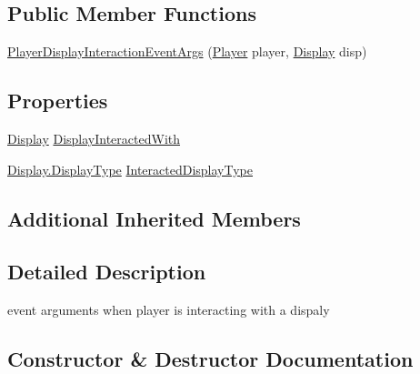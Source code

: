 \subsection*{Public Member Functions}
\begin{DoxyCompactItemize}
\item 
\mbox{\hyperlink{class_player_display_interaction_event_args_a55466b3a7dae1ed3b825c4e6c7e4967c}{Player\+Display\+Interaction\+Event\+Args}} (\mbox{\hyperlink{class_player}{Player}} player, \mbox{\hyperlink{class_display}{Display}} disp)
\end{DoxyCompactItemize}
\subsection*{Properties}
\begin{DoxyCompactItemize}
\item 
\mbox{\hyperlink{class_display}{Display}} \mbox{\hyperlink{class_player_display_interaction_event_args_a52aeb669218099852d66e6fc02247b8f}{Display\+Interacted\+With}}
\item 
\mbox{\hyperlink{class_display_a7f7abc559192ef7e8f4a03382d3492d7}{Display.\+Display\+Type}} \mbox{\hyperlink{class_player_display_interaction_event_args_a535db31e6a8cae469787cb100f2a4ba6}{Interacted\+Display\+Type}}
\end{DoxyCompactItemize}
\subsection*{Additional Inherited Members}


\subsection{Detailed Description}
event arguments when player is interacting with a dispaly 



\subsection{Constructor \& Destructor Documentation}
\mbox{\label{class_player_display_interaction_event_args_a55466b3a7dae1ed3b825c4e6c7e4967c}} 
